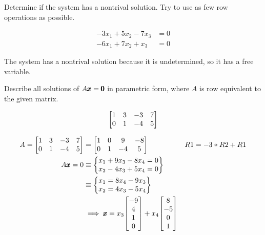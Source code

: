 \documentclass{../mathhomework}
\newenvironment{Mat}{\begin{bmatrix}}{\end{bmatrix}}
\begin{document}
\begin{problem}[1.5\#3]
    Determine if the system  has a nontrival solution. Try to use as few row operations as possible.

    \begin{align*}
        -3x_1 + 5x_2 - 7x_3 &= 0 \\
        -6x_1 + 7x_2 + x_3 &= 0
    \end{align*}

    \begin{solution}
        The system has a nontrival solution because it is undetermined, so it has a free variable.
    \end{solution}
\end{problem}

\begin{problem}[1.5\#7]
    Describe all solutions of $A\pmb{x} = \pmb{0}$ in parametric form, where $A$ is row equivalent to the given matrix.

    \begin{equation*}
        \begin{Mat}
            1 & 3 & -3 & 7 \\
            0 & 1 & -4 & 5
        \end{Mat}
    \end{equation*}

    \begin{solution}
        \begin{align*}
            A = \begin{Mat}
                1 & 3 & -3 & 7 \\
                0 & 1 & -4 & 5
            \end{Mat} & =
            \begin{Mat}
                1 & 0 & 9 & -8 \\
                0 & 1 & -4 & 5
            \end{Mat} & R1 = -3 * R2 + R1 \\
            A\Vect{x} = 0 & \equiv
            \begin{Bmatrix}
                x_1 + 9x_3 - 8x_4 = 0 \\
                x_2 - 4x_3 + 5x_4 = 0
            \end{Bmatrix} \\ & \equiv
            \begin{Bmatrix}
                x_1 = 8x_4 - 9x_3 \\
                x_2 = 4x_3 - 5x_4
            \end{Bmatrix} \\
            & \implies \Vect{x} = x_3\begin{Mat}-9\\4\\1\\0\end{Mat} + x_4\begin{Mat}8\\-5\\0\\1\end{Mat}
        \end{align*}
    \end{solution}
\end{problem}
\end{document}
